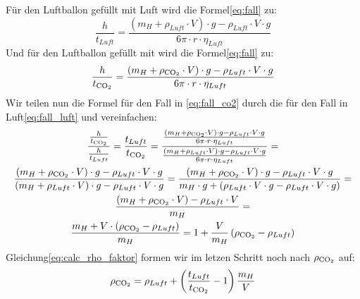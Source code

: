 \documentclass{article}
\begin{document}
    Für den Luftballon gefüllt mit Luft wird die Formel\ref{eq:fall} zu:
    \begin{equation} \label{eq:fall_luft}
        \frac{h}{t_{Luft}} = \frac{ \left( m_H + \rho_{Luft} \cdot V \right) \cdot g - \rho_{Luft} \cdot V \cdot g }{ 6 \pi \cdot r \cdot \eta_{Luft} }
    \end{equation}
    Und für den Luftballon gefüllt mit  wird die Formel\ref{eq:fall} zu:
    \begin{equation} \label{eq:fall_co2}
        \frac{h}{t_{\ce{CO2}}} = \frac{ \left( m_H + \rho_{\ce{CO2}} \cdot V \right) \cdot g - \rho_{Luft} \cdot V \cdot g }{ 6 \pi \cdot r \cdot \eta_{Luft} }
    \end{equation}
    Wir teilen nun die Formel für den Fall in \ref{eq:fall_co2} durch die für den Fall in Luft\ref{eq:fall_luft} und vereinfachen:
    \begin{equation} \label{eq:calc_rho_faktor}
        \begin{gathered}
            \frac{ \frac{h}{t_{\ce{CO2}}} }{ \frac{h}{t_{Luft}} } = \frac{ t_{Luft} }{ t_{\ce{CO2}} } =
            \frac{ \frac{ \left( m_H + \rho_{\ce{CO2}} \cdot V \right) \cdot g - \rho_{Luft} \cdot V \cdot g }{ 6 \pi \cdot r \cdot \eta_{Luft} } }
                 { \frac{ \left( m_H + \rho_{Luft} \cdot V \right) \cdot g - \rho_{Luft} \cdot V \cdot g }{ 6 \pi \cdot r \cdot \eta_{Luft} } } = \\
            \frac{ \left( m_H + \rho_{\ce{CO2}} \cdot V \right) \cdot g - \rho_{Luft} \cdot V \cdot g }{ \left( m_H + \rho_{Luft} \cdot V \right) \cdot g - \rho_{Luft} \cdot V \cdot g } =
            \frac{ \left( m_H + \rho_{\ce{CO2}} \cdot V \right) \cdot g - \rho_{Luft} \cdot V \cdot g }{ m_H \cdot g + \left( \rho_{Luft} \cdot V \cdot g - \rho_{Luft} \cdot V \cdot g \right) } = \\
            \frac{ \left( m_H + \rho_{\ce{CO2}} \cdot V \right) - \rho_{Luft} \cdot V }{ m_H } = \\
            \frac{ m_H + V \cdot \left( \rho_{\ce{CO2}} - \rho_{Luft} \right)}{ m_H } = 1 + \frac{V}{m_H} \left( \rho_{\ce{CO2}} - \rho_{Luft} \right)
        \end{gathered}
    \end{equation} 
    Gleichung\ref{eq:calc_rho_faktor} formen wir im letzen Schritt noch nach \(\rho_{\ce{CO2}}\) auf:
    \begin{equation} \label{eq:calc_rho_co2}
        \rho_{\ce{CO2}} = \rho_{Luft} + \left( \frac{t_{Luft}}{t_{\ce{CO2}}} - 1 \right) \frac{m_H}{V}
    \end{equation}
\end{document}
